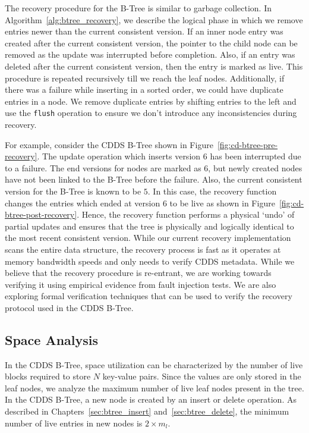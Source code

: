 The recovery procedure for the B-Tree is similar to garbage
collection.  In Algorithm~\ref{alg:btree_recovery}, we describe 
the logical phase in which we remove entries newer than 
the current consistent version. If an inner node entry was created
after the current consistent version, the pointer to the child node
can be removed as the update was interrupted before completion.  Also,
if an entry was deleted after the current consistent version, then the
entry is marked as live.  This procedure is repeated recursively
till we reach the leaf nodes.  Additionally, if there was a failure
while inserting in a sorted order, we could have duplicate entries 
in a node. We remove duplicate entries by shifting entries to the 
left and use the \texttt{flush} operation to ensure we don't introduce
any inconsistencies during recovery.

For example, consider the CDDS B-Tree shown in 
Figure~\ref{fig:cd-btree-pre-recovery}. The update operation which
inserts version $6$ has been interrupted due to a failure. The end
versions for nodes are marked as $6$, but newly created nodes have not
been linked to the B-Tree before the failure. Also, the current 
consistent version for the B-Tree is known to be $5$. In this case,
the recovery function changes the entries which ended at version $6$
to be live as shown in Figure~\ref{fig:cd-btree-post-recovery}.
Hence, the recovery function performs a physical `undo' of partial 
updates and ensures that the tree is physically and logically 
identical to the most recent consistent version.  While our current 
recovery implementation scans the entire data structure, the recovery
process is fast as it operates at memory bandwidth speeds and only 
needs to verify CDDS metadata.  While we believe that the recovery 
procedure is re-entrant, we are working towards verifying it using 
empirical evidence from fault injection tests. We are also exploring
formal verification techniques that can be used to verify the 
recovery protocol used in the CDDS B-Tree. 


\subsection{Space Analysis}
\label{sec:space_analysis}

In the CDDS B-Tree, space utilization can be characterized by the
number of live blocks required to store $N$ key-value pairs. Since the
values are only stored in the leaf nodes, we analyze the maximum
number of live leaf nodes present in the tree. In the CDDS B-Tree, a
new node is created by an insert or delete operation.  As
described in Chapters~\ref{sec:btree_insert}
and~\ref{sec:btree_delete}, the minimum number of live entries in
new nodes is $2\times m_{l}$.

